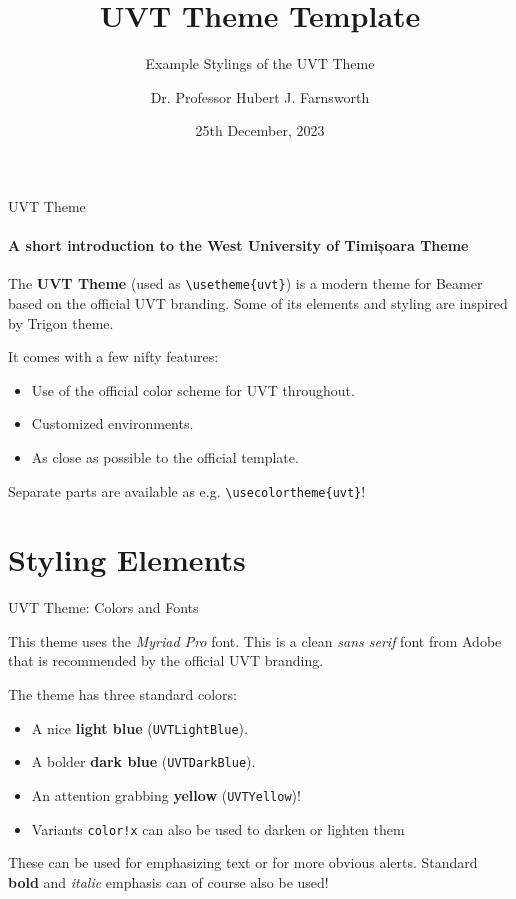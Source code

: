\documentclass[aspectratio=43]{beamer}
\title{UVT Theme Template}
\subtitle{Example Stylings of the UVT Theme}
\author[H. J. F.]{Dr. Professor Hubert J. Farnsworth}
\institute{West University of Timișoara}
\date{25th December, 2023}
\begin{document}
\titleframe

\begin{frame}{UVT Theme}
\framesubtitle{A short introduction to the West University of Timișoara Theme}

The \textbf{UVT Theme} (used as \texttt{\textbackslash usetheme\{uvt\}}) is a
modern theme for Beamer based on the official
\textcolor{UVTLightBlue}{UVT branding}\footnotemark[1]. Some
of its elements and styling are inspired by \textcolor{UVTLightBlue}{Trigon}
theme\footnotemark[2].

\bigskip
It comes with a few nifty features:
\begin{itemize}
    \item Use of the official color scheme for UVT throughout.
    \item Customized environments.
    \item As close as possible to the official template.
\end{itemize}

\bigskip
Separate parts are available as e.g. \texttt{\textbackslash usecolortheme\{uvt\}}!

\end{frame}

\section{Styling Elements}

\begin{frame}{UVT Theme: Colors and Fonts}

This theme uses the \emph{Myriad Pro} font. This is a clean \emph{sans serif}
font from Adobe that is recommended by the official UVT branding.

\bigskip
The theme has three standard colors:
\begin{itemize}
    \item A nice \textcolor{UVTLightBlue}{\textbf{light blue}} (\texttt{UVTLightBlue}).
    \item A bolder \textcolor{UVTDarkBlue}{\textbf{dark blue}} (\texttt{UVTDarkBlue}).
    \item An attention grabbing \textcolor{UVTYellow}{\textbf{yellow}}
    (\texttt{UVTYellow})!
    \item Variants \texttt{color!x} can also be used to darken or lighten them
\end{itemize}

\bigskip
These can be used for emphasizing \textcolor{UVTLightBlue}{text} or for
more obvious \alert{alerts}. Standard \textbf{bold} and \textit{italic} emphasis
can of course also be used!
\end{frame}
\end{document}
